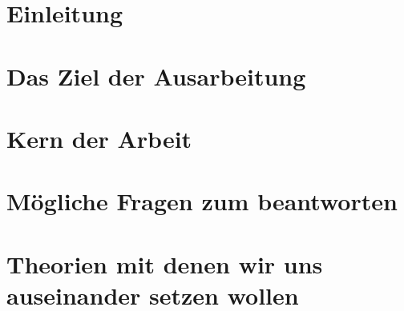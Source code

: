 \documentclass[12pt]{article}
\begin{document}
    
    \newpage

    \tableofcontents
    \newpage

    \section{Einleitung}
        
    
    \section{Das Ziel der Ausarbeitung} 
        

    \section{Kern der Arbeit}
            

    \newpage    
    
    \section{Mögliche Fragen zum beantworten}
        
    
    \section{Theorien mit denen wir uns auseinander setzen wollen}
        
    
    \newpage
\end{document}

